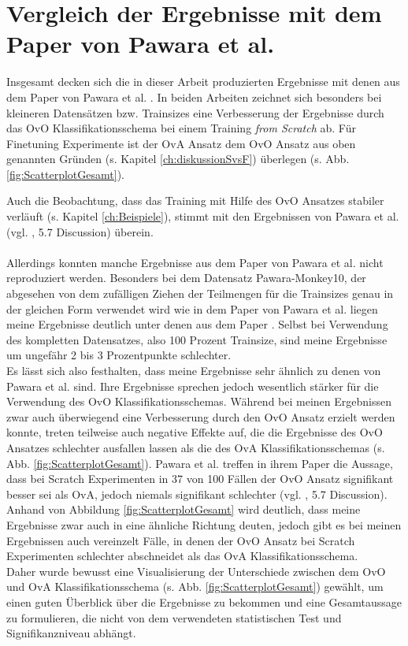 \newpage

\section{Vergleich der Ergebnisse mit dem Paper von Pawara et al. \cite{pawaraPaper}}
Insgesamt decken sich die in dieser Arbeit produzierten Ergebnisse mit denen aus dem Paper von Pawara et al. \cite{pawaraPaper}. In beiden Arbeiten zeichnet sich besonders bei kleineren Datensätzen bzw. Trainsizes eine Verbesserung der Ergebnisse durch das OvO Klassifikationsschema bei einem Training \textit{from Scratch} ab. Für Finetuning Experimente ist der OvA Ansatz dem OvO Ansatz aus oben genannten Gründen (s. Kapitel \ref{ch:diskussionSvsF}) überlegen (s. Abb. \ref{fig:ScatterplotGesamt}).

Auch die Beobachtung, dass das Training mit Hilfe des OvO Ansatzes stabiler verläuft (s. Kapitel \ref{ch:Beispiele}), stimmt mit den Ergebnissen von Pawara et al. (vgl. \cite{pawaraPaper}, 5.7 Discussion) überein.\\\\

Allerdings konnten manche Ergebnisse aus dem Paper von Pawara et al. \cite{pawaraPaper} nicht reproduziert werden. Besonders bei dem Datensatz Pawara-Monkey10, der abgesehen von dem zufälligen Ziehen der Teilmengen für die Trainsizes genau in der gleichen Form verwendet wird wie in dem Paper von Pawara et al. \cite{pawaraPaper} liegen meine Ergebnisse deutlich unter denen aus dem Paper \cite{pawaraPaper}. Selbst bei Verwendung des kompletten Datensatzes, also 100 Prozent Trainsize, sind meine Ergebnisse um ungefähr 2 bis 3 Prozentpunkte schlechter.\\

Es lässt sich also festhalten, dass meine Ergebnisse sehr ähnlich zu denen von Pawara et al. \cite{pawaraPaper} sind. Ihre Ergebnisse sprechen jedoch wesentlich stärker für die Verwendung des OvO Klassifikationsschemas. Während bei meinen Ergebnissen zwar auch überwiegend eine Verbesserung durch den OvO Ansatz erzielt werden konnte, treten teilweise auch negative Effekte auf, die die Ergebnisse des OvO Ansatzes schlechter ausfallen lassen als die des OvA Klassifikationsschemas (s. Abb. \ref{fig:ScatterplotGesamt}). Pawara et al. \cite{pawaraPaper} treffen in ihrem Paper die Aussage, dass bei Scratch Experimenten in 37 von 100 Fällen der OvO Ansatz signifikant besser sei als OvA, jedoch niemals signifikant schlechter (vgl. \cite{pawaraPaper}, 5.7 Discussion).
Anhand von Abbildung \ref{fig:ScatterplotGesamt} wird deutlich, dass meine Ergebnisse zwar auch in eine ähnliche Richtung deuten, jedoch gibt es bei meinen Ergebnissen auch vereinzelt Fälle, in denen der OvO Ansatz bei Scratch Experimenten schlechter abschneidet als das OvA Klassifikationsschema.\\
Daher wurde bewusst eine Visualisierung der Unterschiede zwischen dem OvO und OvA Klassifikationsschema (s. Abb. \ref{fig:ScatterplotGesamt}) gewählt, um einen guten Überblick über die Ergebnisse zu bekommen und eine Gesamtaussage zu formulieren, die nicht von dem verwendeten statistischen Test und Signifikanzniveau abhängt.